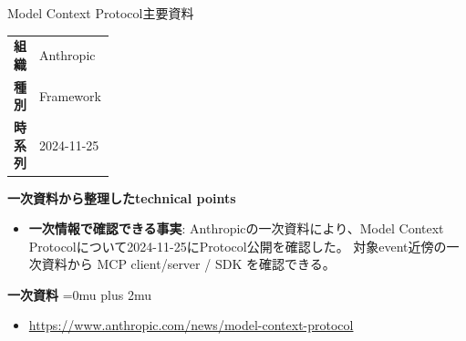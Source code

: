 \begin{technicalnote}{Model Context Protocol}{主要資料}
\begingroup
\begin{tabularx}{\linewidth}{@{}>{\bfseries}p{0.22\linewidth}X@{}}
組織 & Anthropic \\
種別 & Framework \\
時系列 & 2024-11-25 \\
\end{tabularx}
\smallskip
{\bfseries 一次資料から整理したtechnical points}
\begin{itemize}[leftmargin=1.5em,itemsep=0.35em]
\item \textbf{一次情報で確認できる事実}: Anthropicの一次資料により、Model Context Protocolについて2024-11-25にProtocol公開を確認した。 対象event近傍の一次資料から MCP client/server / SDK を確認できる。
\end{itemize}
\begin{minipage}{\linewidth}
\begin{samepage}
{\bfseries 一次資料}
\begingroup\sloppy
\Urlmuskip=0mu plus 2mu\relax
\begin{itemize}[leftmargin=1.5em,itemsep=0.25em]
\item {\scriptsize\url{https://www.anthropic.com/news/model-context-protocol}}
\end{itemize}
\endgroup
\end{samepage}
\end{minipage}
\endgroup
\end{technicalnote}
\medskip

